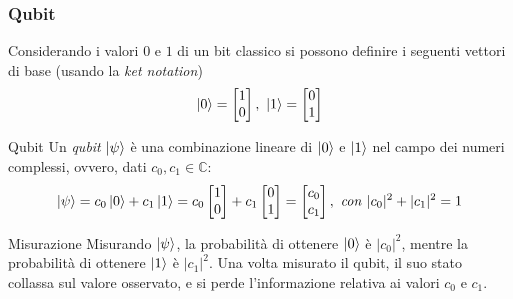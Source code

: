 \documentclass{beamer}
\begin{document}
\begin{frame}
    \frametitle{Qubit}
    Considerando i valori $0$ e $1$ di un bit classico si possono definire i seguenti vettori di base (usando la \textit{ket notation})
    \begin{equation*}
        \ket{0} = \begin{bmatrix} 1 \\ 0 \end{bmatrix},\ 
        \ket{1} = \begin{bmatrix} 0 \\ 1 \end{bmatrix}
    \end{equation*}
    \begin{block}{Qubit}
        Un \emph{qubit} $\ket{\psi}$ è una combinazione lineare di $\ket{0}$ e $\ket{1}$ nel campo dei numeri complessi, ovvero, dati $c_0, c_1 \in \mathbb{C}$:
        \begin{equation*}
            \ket{\psi} = c_0\ket{0}+c_1\ket{1} = c_0\begin{bmatrix} 1 \\ 0 \end{bmatrix}+ c_1\begin{bmatrix} 0 \\ 1 \end{bmatrix} = \begin{bmatrix} c_0 \\ c_1 \end{bmatrix},\ \mathit{con}\ |c_0|^2+|c_1|^2=1
        \end{equation*}
    \end{block}
    \begin{block}{Misurazione}
        Misurando $\ket{\psi}$, la probabilità di ottenere $\ket{0}$ è $|c_0|^2$, mentre la probabilità di ottenere $\ket{1}$ è $|c_1|^2$. Una volta misurato il qubit, il suo stato collassa sul valore osservato, e si perde l'informazione relativa ai valori $c_0$ e $c_1$.
    \end{block}
    
\end{frame}
\end{document}
